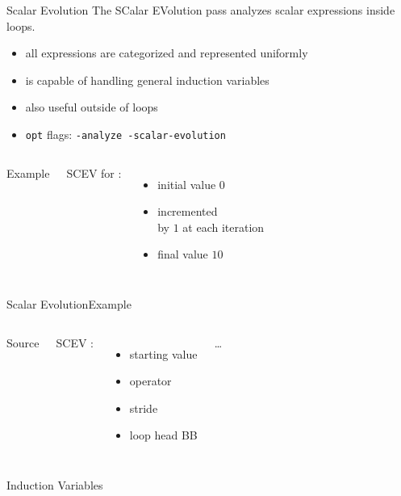 \begin{frame}{Scalar Evolution}
The \alert{SC}alar \alert{EV}olution pass analyzes scalar
expressions inside loops.

\begin{itemize}
\item all expressions are categorized and represented uniformly
\item is capable of handling \alert{general induction variables}
\item also useful outside of loops
\item \texttt{opt} flags: \texttt{-analyze -scalar-evolution}
\end{itemize}

\vfill
\begin{columns}[onlytextwidth]
\begin{block}{Example}
\end{block}

SCEV for :

\begin{itemize}
\item initial value $0$
\item incremented \\by $1$ at each iteration
\item final value $10$
\end{itemize}
\end{columns}
\end{frame}


\begin{frame}{Scalar Evolution}{Example}
\begin{columns}
\begin{block}{Source}
\end{block}

SCEV :

\begin{itemize}
\item {} starting value
\item {} operator
\item {} stride
\item {} loop head BB
\end{itemize}

\ldots

\end{columns}

\vfill
\begin{block}{Induction Variables}
\centering
{}
\end{block}
\end{frame}


